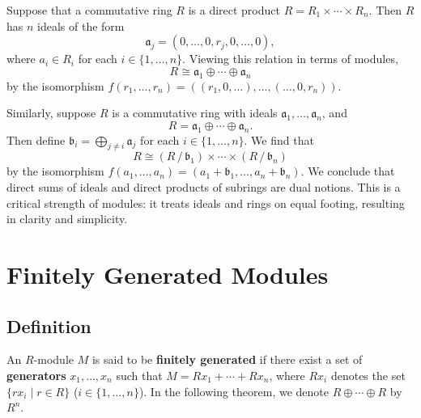 \documentclass[11pt]{article}
\begin{document}
Suppose that a commutative ring $R$ is a direct product $R = R_{1} \times \cdots \times R_{n}$. Then $R$ has $n$ ideals of the form
\[
	\mathfrak{a}_{j} = (0, \ldots, 0, r_{j}, 0, \ldots, 0),
\]
where $a_{i} \in R_{i}$ for each $i \in \{ 1, \ldots, n \}$. Viewing this relation in terms of modules,
\[
	R \cong \mathfrak{a}_{1} \oplus \cdots \oplus \mathfrak{a}_{n}
\]
by the isomorphism $f(r_{1}, \ldots, r_{n}) = ((r_{1}, 0, \ldots), \ldots, (\ldots, 0, r_{n}))$.

Similarly, suppose $R$ is a commutative ring with ideals $\mathfrak{a}_{1}, \ldots, \mathfrak{a}_{n}$, and
\[
	R = \mathfrak{a}_{1} \oplus \cdots \oplus \mathfrak{a}_{n}.
\]
Then define $\mathfrak{b}_{i} = \bigoplus_{j \ne i} \mathfrak{a}_{j}$ for each $i \in \{ 1, \ldots, n \}$. We find that
\[
	R \cong (R \,/\, \mathfrak{b}_{1}) \times \cdots \times (R \,/\, \mathfrak{b}_{n})
\]
by the isomorphism $f(a_{1}, \ldots, a_{n}) = (a_{1} + \mathfrak{b}_{1}, \ldots, a_{n} + \mathfrak{b}_{n})$. We conclude that direct sums of ideals and direct products of subrings are dual notions. This is a critical strength of modules: it treats ideals and rings on equal footing, resulting in clarity and simplicity.


\section{Finitely Generated Modules}


\subsection{Definition}

An $R$-module $M$ is said to be \textbf{finitely generated} if there exist a set of \textbf{generators} $x_{1}, \ldots, x_{n}$ such that $M = Rx_{1} + \cdots + Rx_{n}$, where $Rx_{i}$ denotes the set $\{ rx_{i} \mid r \in R \}$ ($i \in \{ 1, \ldots, n \}$). In the following theorem, we denote $R \oplus \cdots \oplus R$ by $R^{n}$.
\end{document}

